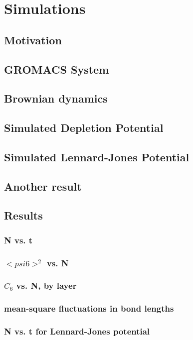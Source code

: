 \documentclass{umthesis}
\begin{document}
\section{Simulations}
\label{sec-1.3}
\subsection{Motivation}
\label{sec-1.3.1}
\subsection{GROMACS System}
\label{sec-1.3.2}
\subsection{Brownian dynamics}
\label{sec-1.3.3}
\subsection{Simulated Depletion Potential}
\label{sec-1.3.4}
\subsection{Simulated Lennard-Jones Potential}
\label{sec-1.3.5}
\subsection{Another result}
\label{sec-1.3.6}
\subsection{Results}
\label{sec-1.3.7}
\subsubsection{N vs. t}
\label{sec-1.3.8}
\subsubsection{$< psi6 >^2$ vs. N}
\label{sec-1.3.9}
\subsubsection{$C_6$ vs. N, by layer}
\label{sec-1.3.10}
\subsubsection{mean-square fluctuations in bond lengths}
\label{sec-1.3.11}
\subsubsection{N vs. t for Lennard-Jones potential}
\label{sec-1.3.12}
\end{document}
